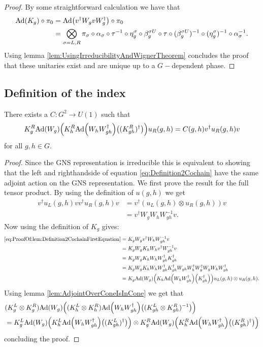 \documentclass[12pt,a4paper,twoside]{article}
\numberwithin{equation}{section}
\begin{document}
\begin{proof}
	By some straightforward calculation we have that
	\begin{align}
		\Ad{K_g}\circ\pi_0&=\Ad{v^\dagger W_g v W_g^\dagger}\circ\pi_0\\
		&=\bigotimes_{\sigma=L,R}\pi_\sigma\circ\alpha_\sigma\circ\tau^{-1}\circ \eta_g^\sigma\circ\beta_g^{\sigma U}\circ\tau\circ(\beta_g^{\sigma U})^{-1}\circ(\eta_g^{\sigma})^{-1}\circ\alpha_\sigma^{-1}.
	\end{align}
	Using lemma \ref{lem:UsingIrreducibilityAndWignerTheorem} concludes the proof that these unitaries exist and are unique up to a $G-$dependent phase.
\end{proof}
\subsection{Definition of the index}
\begin{lemma}\label{lem:Definition2Cochain}
	There exists a $C:G^2\rightarrow U(1)$ such that 
	\begin{equation}\label{eq:Definition2Cochain}
		K_g^R\Ad{W_g}\left(K_h^R\Ad{W_hW_{gh}^\dagger}\left((K_{gh}^R)^\dagger\right)\right)u_
		R(g,h)=C(g,h)v^\dagger u_R(g,h)v
	\end{equation}
	for all $g,h\in G.$
\end{lemma}
\begin{proof}
	Since the GNS representation is irreducible this is equivalent to showing that the left and righthandside of equation \eqref{eq:Definition2Cochain} have the same adjoint action on the GNS representation. We first prove the result for the full tensor product. By using the definition of $u(g,h)$ we get
	\begin{align}\label{eq:ProofOf:lem:Definition2CochainFirstEquation}
		v^\dagger u_L(g,h)v v^\dagger u_R(g,h) v&=v^\dagger (u_L(g,h)\otimes u_R(g,h)) v\\
		&=v^\dagger W_g W_h W_{gh}^{-1}v.
	\end{align}
	Now using the definition of $K_g$ gives:
	\begin{align}
		\eqref{eq:ProofOf:lem:Definition2CochainFirstEquation}&=K_gW_g v^\dagger W_h W_{gh}^{-1}v\\
		&=K_gW_g K_h W_h v^\dagger W_{gh}^{-1}v\\
		&=K_gW_g K_h W_h W_{gh}^\dagger K_{gh}^\dagger\\
		&=K_gW_g K_h W_h W_{gh}^\dagger K_{gh}^\dagger W_{gh}W_h^\dagger W_g^\dagger W_gW_hW_{gh}^\dagger\\
		&=K_g\Ad{W_g}\left(K_h\Ad{W_hW_{gh}^\dagger}\left(K_{gh}^\dagger\right)\right)u_L(g,h)\otimes u_
			R(g,h).
	\end{align}
	Using lemma \ref{lem:AdjointOverConeIsInCone} we get that
	\begin{align}
		&(K_g^L\otimes K_g^R)\Ad{W_g}\left((K_h^L\otimes K_h^R)\Ad{W_hW_{gh}^\dagger}\left((K_{gh}^L\otimes K_{gh}^R)^{-1}\right)\right)\\
		&=K_g^L\Ad{W_g}\left(K_h^L\Ad{W_hW_{gh}^\dagger}\left((K_{gh}^L)^\dagger\right)\right)\otimes K_g^R\Ad{W_g}\left(K_h^R\Ad{W_hW_{gh}^\dagger}\left((K_{gh}^R)^\dagger\right)\right)
	\end{align}
	concluding the proof.
\end{proof}
\end{document}
